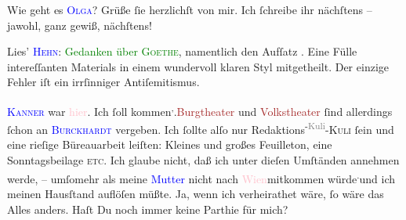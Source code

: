 \pstart
           Wie geht es \textsc{\textcolor{blue}{Olga}{}\ledrightnote{\textcolor{blue}{Olga Schnitzler}}}? Grüße ſie herzlichſt von mir. Ich ſchreibe ihr nächſtens – jawohl, ganz gewiß,
               nächſtens!\pend
           
\pstart
           Lies’ \textsc{\textcolor{blue}{Hehn}{}\ledrightnote{\textcolor{blue}{Victor Hehn}}}: \textcolor{green}{Gedanken über \textsc{Goethe}}{}\ledrightnote{\textcolor{green}{Gedanken über Goethe}}, namentlich den Aufſatz \label{K_L03204-10v}\label{K_L03204-10h}. Eine Fülle
               intereſſanten Materials in einem wundervoll klaren {\pb}Styl mitgetheilt. Der einzige Fehler iſt\strikeout{,} ein
               irrſinniger Antiſemitismus.\pend
           
\pstart
           \textsc{\textcolor{blue}{Kanner}{}\ledrightnote{\textcolor{blue}{Heinrich Kanner}}} war \textcolor{pink}{hier}{}\ledrightnote{{$\rightarrow$}\textcolor{pink}{Berlin}}. Ich ſoll
                  \label{K_L03204-11v}\label{K_L03204-11h} kommen\substVorne{}\textsuperscript{,}\substDazwischen{}.\substHinten{}{ }\textcolor{brown}{Burgtheater}{}\ledrightnote{\textcolor{brown}{Burgtheater}} und \textcolor{brown}{Volkstheater}{}\ledrightnote{\textcolor{brown}{Volkstheater}} ſind allerdings ſchon an \textsc{\textcolor{blue}{Burckhardt}{}\ledrightnote{\textcolor{blue}{Max Eugen Burckhard}}} vergeben. Ich ſollte alſo nur Redaktions\substVorne{}\textsuperscript{-\textcolor{gray}{Kuli}}\substDazwischen{}-\textsc{Kuli}\substHinten{} ſein und eine rieſige Büreauarbeit leiſten: Kleines und großes Feuilleton,
               eine Sonntagsbeilage \textsc{etc}. Ich glaube nicht, daß ich unter
               dieſen Umſtänden annehmen werde, – umſomehr als meine \textcolor{blue}{Mutter}{}\ledrightnote{{$\rightarrow$}\textcolor{blue}{Clementine Goldmann}} nicht nach \textcolor{pink}{Wien}{}\ledrightnote{\textcolor{pink}{Wien}}{ }{\pb}mitkommen würde\substVorne{}\textsuperscript{.}\substDazwischen{}{ }und ich meinen Hausſtand auflöſen
                     müßte.\substHinten{} Ja, wenn ich verheirathet wäre, ſo wäre das Alles anders. Haſt Du noch immer
               keine Parthie für mich?\pend
           

